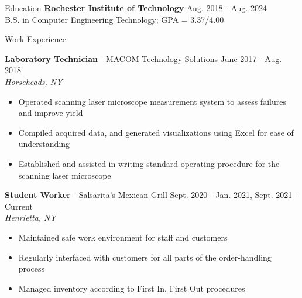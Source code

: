 \documentclass[UTF-8]{resume} \usepackage{multirow}
\begin{document}
\begin{rSection}{Education}
	{\bf Rochester Institute of Technology}  \hfill {Aug. 2018 - Aug. 2024}\\
	B.S. in Computer Engineering Technology; GPA = 3.37/4.00
\end{rSection}


        \begin{rSection}{Work Experience}
    	    \vspace{-1.6em}
        \item \textbf{Laboratory Technician} {- MACOM Technology Solutions} \hfill {June 2017 - Aug. 2018}\\
            \emph{Horseheads, NY}
            \begin{itemize}
                \itemsep -5pt {}
                \item Operated scanning laser microscope measurement system to assess failures and improve yield
                \item Compiled acquired data, and generated visualizations using Excel for ease of understanding
                \item Established and assisted in writing standard operating procedure for the scanning laser microscope
            \end{itemize}
        \item \textbf{Student Worker} {- Salsarita's Mexican Grill} \hfill {Sept. 2020 - Jan. 2021, Sept. 2021 - Current}\\
            \emph{Henrietta, NY}
            \begin{itemize}
                \itemsep -5pt {}
                \item Maintained safe work environment for staff and customers
                \item Regularly interfaced with customers for all parts of the order-handling process
                \item Managed inventory according to First In, First Out procedures
            \end{itemize}
        \end{rSection}
\end{document}
